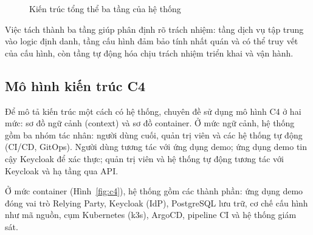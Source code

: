 \begin{figure}[htbp]
\centering
{}
\caption{Kiến trúc tổng thể ba tầng của hệ thống}
\label{fig:kientruc}
\end{figure}

Việc tách thành ba tầng giúp phân định rõ trách nhiệm: tầng dịch vụ tập trung
vào logic định danh, tầng cấu hình đảm bảo tính nhất quán và có thể truy vết
của cấu hình, còn tầng tự động hóa chịu trách nhiệm triển khai và vận hành.

\subsection{Mô hình kiến trúc C4}
\label{subsec:c4}

Để mô tả kiến trúc một cách có hệ thống, chuyên đề sử dụng mô hình C4 ở hai
mức: sơ đồ ngữ cảnh (context) và sơ đồ container. Ở mức ngữ cảnh, hệ thống gồm
ba nhóm tác nhân: người dùng cuối, quản trị viên và các hệ thống tự động
(CI/CD, GitOps). Người dùng tương tác với ứng dụng demo; ứng dụng demo tin cậy
Keycloak để xác thực; quản trị viên và hệ thống tự động tương tác với Keycloak
và hạ tầng qua API.

Ở mức container (Hình~\ref{fig:c4}), hệ thống gồm các thành phần: ứng dụng demo
đóng vai trò Relying Party, Keycloak (IdP), PostgreSQL lưu trữ, cơ chế cấu hình
như mã nguồn, cụm Kubernetes (k3s), ArgoCD, pipeline CI và hệ thống giám sát.

